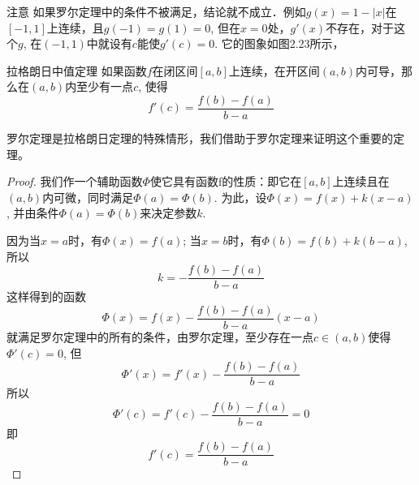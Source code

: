 \begin{figure}[htp]
    \centering
    \begin{minipage}[t]{0.48\textwidth}
    \centering
{}
    \caption{}
    \end{minipage}
    \begin{minipage}[t]{0.48\textwidth}
    \centering
    \caption{}
    \end{minipage}
    \end{figure}


\begin{rmk}
    注意 如果罗尔定理中的条件不被满足，结论就不成立．例如$g(x)=1-|x|$在$[-1, 1]$上连续，且$g(-1)=g(1)=0$, 但在$x=0$处，$g'(x)$不存在，对于这个$g$, 在$(-1,1)$中就设有$c$能使$g'(c)=0$. 它的图象如图2.23所示，
\end{rmk}

\begin{blk}
    {拉格朗日中值定理} 如果函数$f$在闭区间$[a,b]$上连续，在开区间$(a,b)$内可导，那么在$(a,b)$内至少有一点$c$, 使得
\[f'(c)=\frac{f(b)-f(a)}{b-a}\]
\end{blk}

罗尔定理是拉格朗日定理的特殊情形，我们借助于罗尔定理来证明这个重要的定理。

\begin{proof}
 我们作一个辅助函数$\Phi$使它具有函数f的性质：即它在$[a,b]$上连续且在$(a,b)$内可微，同时满足$\Phi (a)=\Phi (b)$. 为此，设$\Phi  (x) =f (x) +k (x-a)$, 并由条件$\Phi (a)=\Phi (b)$来决定参数$k$. 

因为当$x=a$时，有$\Phi (x)=f(a)$; 当$x=b$时，有$\Phi (b)=f(b)+k(b-a)$, 所以
\[k=-\frac{f (b) -f (a)}{b-a}\]
这样得到的函数
\[\Phi  (x) =f (x) -\frac{f (b) -f (a) }{b-a}(x-a)\]
就满足罗尔定理中的所有的条件，由罗尔定理，至少存在一点$c\in (a,b)$使得$\Phi '(c)=0$,
但
\[\Phi ' (x) =f' (x) -\frac{f (b) -f (a)}{b-a}\]
所以
\[\Phi ' (c) =f' (c) -\frac{f (b) -f (a)}{b-a} =0\]
即
\[f' (c) =\frac{f (b) -f (a)}{b-a}\]
\end{proof}

